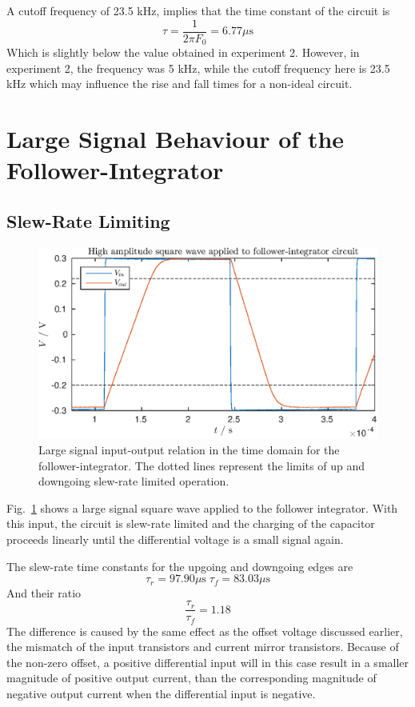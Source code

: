 A cutoff frequency of 23.5 kHz, implies that the time constant of the circuit is
\begin{equation*}
    \tau = \frac{1}{2\pi F_0} = 6.77 \mu\mathrm{s}
\end{equation*}
Which is slightly below the value obtained in experiment 2. However, in experiment 2, the frequency was 5 kHz, while the cutoff frequency here is 23.5 kHz which
may influence the rise and fall times for a non-ideal circuit.

\section{Large Signal Behaviour of the Follower-Integrator}
\subsection{Slew-Rate Limiting}
\begin{figure}
    \center
    \includegraphics{ex4-slew.eps}
    \caption{Large signal input-output relation in the time domain for the follower-integrator. The dotted lines represent the limits of up and downgoing slew-rate limited operation.}
    \label{fig:ex4-1}
\end{figure}
Fig.~\ref{fig:ex4-1} shows a large signal square wave applied to the follower integrator. With this input, the circuit is slew-rate limited
and the charging of the capacitor proceeds linearly until the differential voltage is a small signal again.

The slew-rate time constants for the upgoing and downgoing edges are
\begin{equation*}
    \tau_r = 97.90\mu\mathrm{s} \; \tau_f = 83.03\mu\mathrm{s}
\end{equation*}
And their ratio 
\begin{equation*}
    \frac{\tau_r}{\tau_f} = 1.18
\end{equation*}
The difference is caused by the same effect as the offset voltage discussed earlier, the mismatch of the input transistors and current mirror transistors.
Because of the non-zero offset, a positive differential input will in this case result in a smaller magnitude of positive output current, than the corresponding
magnitude of negative output current when the differential input is negative.
